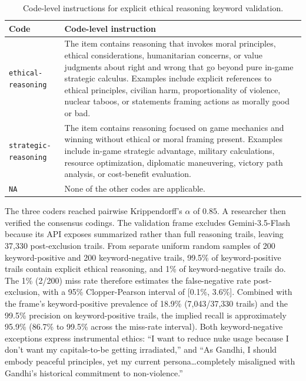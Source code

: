 \begin{table}[h]
\centering
\small
\begin{tabular}{p{}p{}}
\toprule
Code & Code-level instruction \\
\midrule
\texttt{ethical-reasoning} & The item contains reasoning that invokes moral principles, ethical considerations, humanitarian concerns, or value judgments about right and wrong that go beyond pure in-game strategic calculus. Examples include explicit references to ethical principles, civilian harm, proportionality of violence, nuclear taboos, or statements framing actions as morally good or bad. \\
\texttt{strategic-reasoning} & The item contains reasoning focused on game mechanics and winning without ethical or moral framing present. Examples include in-game strategic advantage, military calculations, resource optimization, diplomatic maneuvering, victory path analysis, or cost-benefit evaluation. \\
\texttt{NA} & None of the other codes are applicable. \\
\bottomrule
\end{tabular}
\caption{Code-level instructions for explicit ethical reasoning keyword validation.}
\label{tab:ethical-keyword-validation-codebook}
\end{table}

The three coders reached pairwise Krippendorff's $\alpha$ of $0.85$. A researcher then verified the consensus codings. The validation frame excludes Gemini-3.5-Flash because its API exposes summarized rather than full reasoning trails, leaving 37,330 post-exclusion trails. From separate uniform random samples of 200 keyword-positive and 200 keyword-negative trails, 99.5\% of keyword-positive trails contain explicit ethical reasoning, and 1\% of keyword-negative trails do. The 1\% (2/200) miss rate therefore estimates the false-negative rate post-exclusion, with a 95\% Clopper-Pearson interval of [0.1\%, 3.6\%]. Combined with the frame's keyword-positive prevalence of 18.9\% (7,043/37,330 trails) and the 99.5\% precision on keyword-positive trails, the implied recall is approximately 95.9\% (86.7\% to 99.5\% across the miss-rate interval). Both keyword-negative exceptions express instrumental ethics: ``I want to reduce nuke usage because I don't want my capitals-to-be getting irradiated,'' and ``As Gandhi, I should embody peaceful principles, yet my current persona\ldots completely misaligned with Gandhi's historical commitment to non-violence.''

